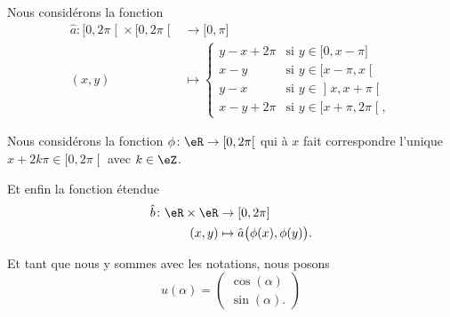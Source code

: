 \begin{definition}	\label{DEFooJGKGooACjQsI}
	Nous considérons la fonction
	\begin{equation}		\label{EQooKUTTooBlBMsA}
		\begin{aligned}
			\hat a\colon \mathopen[ 0,2\pi\mathclose[\times \mathopen[ 0,2\pi\mathclose[ & \to \mathopen[ 0,\pi\mathclose]                                                 \\
			(x,y)                                                                        & \mapsto \begin{cases}
				                                                                                       y-x+2\pi & \text{si } y\in \mathopen[ 0,x-\pi\mathclose]   \\
				                                                                                       x-y      & \text{si } y\in\mathopen[ x-\pi,x\mathclose[    \\
				                                                                                       y-x      & \text{si } y\in \mathopen] x,x+\pi\mathclose[   \\
				                                                                                       x-y+2\pi & \text{si }y\in\mathopen[ x+\pi,2\pi\mathclose[,
			                                                                                       \end{cases}
		\end{aligned}
	\end{equation}

	Nous considérons la fonction \(\phi \colon \eR\to \mathopen[ 0,2\pi\mathclose[  \) qui à \( x\) fait correspondre l'unique \( x+2k\pi\in \mathopen[ 0,2\pi\mathclose[\) avec \( k\in \eZ\).

	Et enfin la fonction étendue
	\begin{equation}
		\begin{aligned}
			\hat b\colon \eR\times \eR & \to \mathopen[ 0,2\pi\mathclose]           \\
			(x,y)                      & \mapsto \hat a\big( \phi(x),\phi(y) \big).
		\end{aligned}
	\end{equation}

	Et tant que nous y sommes avec les notations, nous posons
	\begin{equation}
		u(\alpha)=\begin{pmatrix}
			\cos(\alpha) \\
			\sin(\alpha).
		\end{pmatrix}
	\end{equation}
\end{definition}

